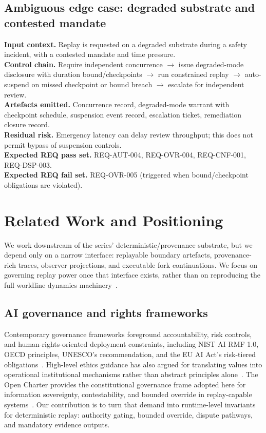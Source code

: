 \documentclass[11pt]{article}
\theoremstyle{definition}
\theoremstyle{plain}
\theoremstyle{remark}
\begin{document}
\subsection{Ambiguous edge case: degraded substrate and contested mandate}
\textbf{Input context.} Replay is requested on a degraded substrate during a safety incident, with a contested mandate and time pressure. \\
\textbf{Control chain.} Require independent concurrence $\rightarrow$ issue degraded-mode disclosure with duration bound/checkpoints $\rightarrow$ run constrained replay $\rightarrow$ auto-suspend on missed checkpoint or bound breach $\rightarrow$ escalate for independent review. \\
\textbf{Artefacts emitted.} Concurrence record, degraded-mode warrant with checkpoint schedule, suspension event record, escalation ticket, remediation closure record. \\
\textbf{Residual risk.} Emergency latency can delay review throughput; this does not permit bypass of suspension controls. \\
\textbf{Expected REQ pass set.} REQ-AUT-004, REQ-OVR-004, REQ-CNF-001, REQ-DSP-003. \\
\textbf{Expected REQ fail set.} REQ-OVR-005 (triggered when bound/checkpoint obligations are violated).

\section{Related Work and Positioning}
\label{sec:related-work}

We work downstream of the series' deterministic/provenance substrate, but we depend only on a narrow
interface: replayable boundary artefacts, provenance-rich traces, observer projections, and executable
fork continuations. We focus on governing replay power once that interface exists, rather than on
reproducing the full worldline dynamics machinery~\cite{ross_paper_v}.

\subsection{AI governance and rights frameworks}
Contemporary governance frameworks foreground accountability, risk controls, and human-rights-oriented
deployment constraints, including NIST AI RMF 1.0, OECD principles, UNESCO's recommendation, and the EU AI
Act's risk-tiered obligations~\cite{nistairmf2023,oecd_ai_2019,unesco_ai_2021,eu_ai_act_2024}.
High-level ethics guidance has also argued for translating values into operational institutional
mechanisms rather than abstract principles alone~\cite{floridi2018}.
The Open Charter provides the constitutional governance frame adopted here for information sovereignty,
contestability, and bounded override in replay-capable systems~\cite{ross_open_charter_0_8_1}.
Our contribution is to turn that demand into runtime-level invariants for deterministic replay:
authority gating, bounded override, dispute pathways, and mandatory evidence outputs.
\end{document}
